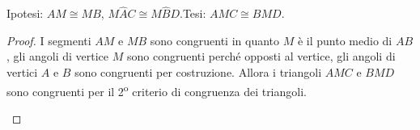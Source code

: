 \begin{exrig}
\begin{esempio}
\begin{multicols}{2}
\noindent Ipotesi: \(AM\cong MB\), \(M\widehat{A}C\cong 
M\widehat{B}D\).\tab Tesi: \(AMC\cong BMD\).

\begin{proof}
I segmenti \(AM\) e \(MB\) sono congruenti in quanto \(M\) è il punto medio 
di \(AB\), gli angoli di vertice \(M\) sono congruenti perché opposti al 
vertice, gli angoli di vertici \(A\) e \(B\) sono congruenti per 
costruzione. Allora i triangoli \(AMC\) e \(BMD\) sono congruenti per il 
2\textsuperscript{o} criterio di congruenza dei triangoli.
\begin{center}
\begin{inaccessibleblock}

\end{inaccessibleblock}
\end{center}
\end{proof}
\end{multicols}
\end{esempio}
\end{exrig}

\begin{comment}
\begin{esempio}\label{esempio:2.2}
...

\begin{multicols}{2}
Realizziamo il disegno ed esplicitiamo ipotesi e tesi.

\noindent Ipotesi: 
\tab Tesi: 

\begin{proof}
...
\begin{center}
\begin{inaccessibleblock}[Figura: TODO]

\end{inaccessibleblock}
\end{center}
\end{proof}
\end{multicols}
\end{esempio}

\begin{teorema}
...
\end{teorema}

\begin{multicols}{2}
Realizziamo il disegno ed esplicitiamo ipotesi e tesi.

\noindent Ipotesi: 
\tab Tesi: 

\begin{proof}
...
\begin{center}
\begin{inaccessibleblock}[Figura: TODO]

\end{inaccessibleblock}
\end{center}
\end{proof}
\end{multicols}
\end{comment}


